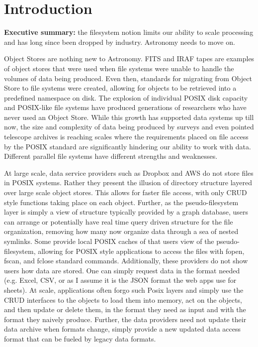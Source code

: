 \section{Introduction} \label{sec:intro}

{\bf Executive summary:} the filesystem notion limits our ability to scale processing and has long since been dropped by industry. Astronomy needs to move on.

Object Stores are nothing new to Astronomy.  \gls{FITS} and \gls{IRAF} tapes are examples
of object stores that were used when file systems were unable to handle the volumes
of data being produced. Even then, standards for migrating from \gls{Object} Store to file
systems were created, allowing for objects to be retrieved into a predefined namespace
on disk.  The explosion of individual \gls{POSIX} disk capacity and \gls{POSIX}-like file systems
have produced generations of researchers who have never used an \gls{Object} Store. While
this growth has supported data systems up till now, the size and complexity of
data being produced by surveys and even pointed telescope archives is reaching
scales where the requirements placed on file access by the \gls{POSIX} standard are
significantly hindering our ability to work with data.  Different parallel file systems
have different strengths and weaknesses.

At large scale, data service providers such as Dropbox and \gls{AWS} do not store files
in \gls{POSIX} systems.  Rather they present the illusion of directory structure layered over
large scale object stores. This allows for faster file access, with only \gls{CRUD} style
functions taking place on each object.  Further, as the pseudo-filesystem layer is simply a
view of structure typically provided by a graph database, users can arrange or potentially
have real time query driven structure for the file organization, removing how many now
organize data through a sea of nested symlinks.
Some provide local \gls{POSIX} caches of that users view of the
pseudo-filesystem, allowing for \gls{POSIX} style applications to access the files with
fopen, fscan, and fclose standard commands. Additionally, these providers do
not show users how data are stored. One can simply request data in the format
needed (e.g. Excel, \gls{CSV}, or as I assume it is the \gls{JSON} format the web apps
use for sheets).   At scale, applications often forgo
such Posix layers and simply use the \gls{CRUD} interfaces to the objects to load them into
memory, act on the objects, and then update or delete them, in the format they need
as input and with the format they naively produce. Further, the data providers need
not update their data archive when formats change, simply provide a new updated
data access format that can be fueled by legacy data formats.


